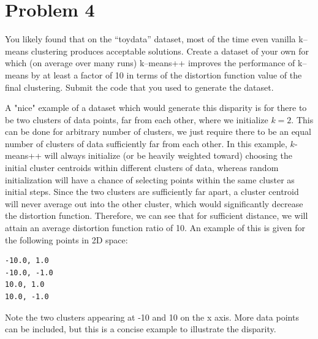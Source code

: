\clearpage
\newpage

\section{Problem 4}
You likely found that on the “toydata” dataset, most of the time even vanilla k–means clustering produces acceptable solutions. Create a dataset of your own for which (on average over many runs) k–means++ improves the performance of k–means by at least a factor of 10 in terms of the distortion function value of the final clustering. Submit the code that you used to generate the dataset.

\partbreak
\begin{solution}

    A "nice" example of a dataset which would generate this disparity is for there to be two clusters of data points, far from each other, where we initialize $k = 2$. This can be done for arbitrary number of clusters, we just require there to be an equal number of clusters of data sufficiently far from each other. In this example, $k$-means++ will always initialize (or be heavily weighted toward) choosing the initial cluster centroids within different clusters of data, whereas random initialization will have a chance of selecting points within the same cluster as initial steps. Since the two clusters are sufficiently far apart, a cluster centroid will never average out into the other cluster, which would significantly decrease the distortion function. Therefore, we can see that for sufficient distance, we will attain an average distortion function ratio of 10. An example of this is given for the following points in 2D space: 
\begin{lstlisting}
-10.0, 1.0
-10.0, -1.0
10.0, 1.0
10.0, -1.0
\end{lstlisting}

Note the two clusters appearing at -10 and 10 on the x axis. More data points can be included, but this is a concise example to illustrate the disparity.  

\end{solution}


